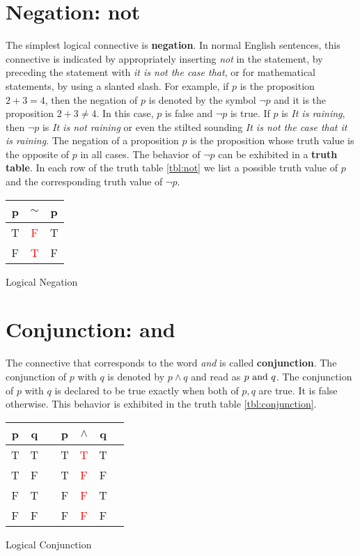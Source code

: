\section{Negation: \textbf{not}}
The simplest logical connective is  {\bfseries negation}. 
In normal English sentences, this connective is indicated by appropriately inserting  {\itshape not} in the statement, by preceding the
statement with {\itshape it is not the case that}, or for mathematical statements, by using a slanted slash.
For example, if $p$ is the proposition $2+3 = 4$, then  the negation of $p$ is denoted by the symbol
$\lnot p$ and it is the proposition  $2+3\neq 4$. In this case, $p$ is false
 and $\lnot p$ is true.  If $p$ is {\itshape It is raining}, then $\lnot p$ is {\itshape It is not raining} or even
the stilted sounding 
{\itshape It is not the case that it is raining}. 
The negation of a proposition $p$ is the proposition whose truth value is the opposite of $p$ in all cases.
The behavior of $\lnot p$ can be exhibited 
in a {\bfseries truth table}. In each row of the truth table \ref{tbl:not} we list a possible truth value of $p$ 
and the corresponding truth value of $\lnot p$.

\begin{margintable}
\begin{tabular}{@{ }c | c@{ }@{ }c}
p & $\sim$ & p\\
\hline 
T & \textcolor{red}{F} & T\\
F & \textcolor{red}{T} & F\\
\end{tabular}
\caption{Logical Negation}
\label{tbl:not}
\end{margintable}


\section{Conjunction: \textbf{and}}
The connective that corresponds to the word {\itshape and} is called {\bfseries conjunction}.  The
conjunction of $p$ with $q$ is denoted  by $p\wedge q$ and read  as {\itshape $p\hbox{ and }q$}. The conjunction of
$p$ with $q$ is declared to be true exactly when both of $p,q$ are true. It is false otherwise. This behavior
is exhibited in the truth table \ref{tbl:conjunction}. 

\begin{margintable}
\begin{tabular}{@{ }c@{ }@{ }c | c@{ }@{ }c@{ }@{ }c@{ }@{ }c@{ }@{ }c}
p & q &  & p & $\land$ & q & \\
\hline 
T & T &  & T & \textcolor{red}{T} & T & \\
T & F &  & T & \textcolor{red}{F} & F & \\
F & T &  & F & \textcolor{red}{F} & T & \\
F & F &  & F & \textcolor{red}{F} & F & \\
\end{tabular}
\caption{Logical Conjunction}
\label{tbl:conjunction}
\end{margintable}

